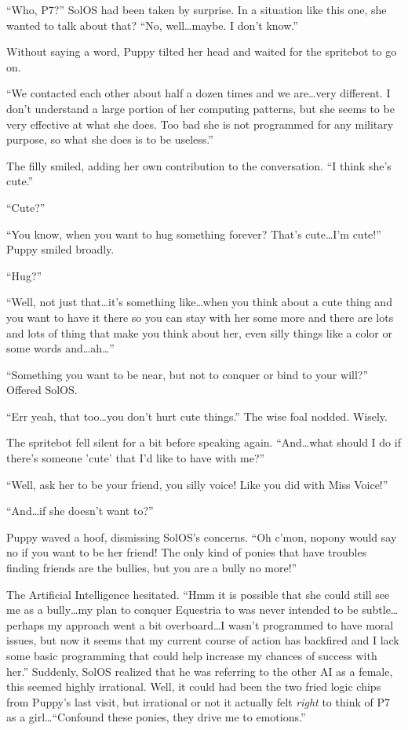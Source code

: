 ``Who, P7?'' SolOS had been taken by surprise. In a situation like this one, she wanted to talk about that? ``No, well\dots maybe. I don't know.''

Without saying a word, Puppy tilted her head and waited for the spritebot to go on.

``We contacted each other about half a dozen times and we are\dots very different. I don't understand a large portion of her computing patterns, but she seems to be very effective at what she does. Too bad she is not programmed for any military purpose, so what she does is to be useless.''

The filly smiled, adding her own contribution to the conversation. ``I think she's cute.''

``Cute?''

``You know, when you want to hug something forever? That's cute\dots I'm cute!'' Puppy smiled broadly.

``Hug?''

``Well, not just that\dots it's something like\dots when you think about a cute thing and you want to have it there so you can stay with her some more and there are lots and lots of thing that make you think about her, even silly things like a color or some words and\dots ah\dots''

``Something you want to be near, but not to conquer or bind to your will?'' Offered SolOS.

``Err yeah, that too\dots you don't hurt cute things.'' The wise foal nodded. Wisely.

The spritebot fell silent for a bit before speaking again. ``And\dots what should I do if there's someone 'cute' that I'd like to have with me?''

``Well, ask her to be your friend, you silly voice! Like you did with Miss Voice!''

``And\dots if she doesn't want to?''

Puppy waved a hoof, dismissing SolOS's concerns. ``Oh c'mon, nopony would say no if you want to be her friend! The only kind of ponies that have troubles finding friends are the bullies, but you are a bully no more!''

The Artificial Intelligence hesitated. ``Hmm it is possible that she could still see me as a bully\dots my plan to conquer Equestria to was never intended to be subtle\dots perhaps my approach went a bit overboard\dots I wasn't programmed to have moral issues, but now it seems that my current course of action has backfired and I lack some basic programming that could help increase my chances of success with her.'' Suddenly, SolOS realized that he was referring to the other AI as a female, this seemed highly irrational. Well, it could had been the two fried logic chips from Puppy's last visit, but irrational or not it actually felt \emph{right} to think of P7 as a girl\dots ``Confound these ponies, they drive me to emotions.''

